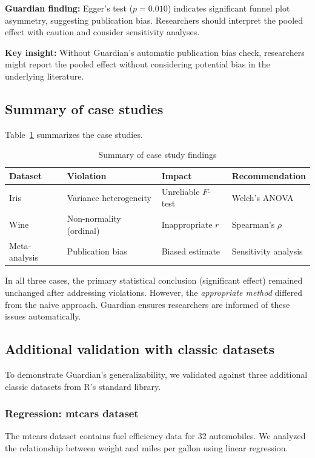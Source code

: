 \documentclass[article]{jss}
\begin{document}
\textbf{Guardian finding:} Egger's test ($p = 0.010$) indicates significant funnel plot asymmetry, suggesting publication bias. Researchers should interpret the pooled effect with caution and consider sensitivity analyses.

\textbf{Key insight:} Without Guardian's automatic publication bias check, researchers might report the pooled effect without considering potential bias in the underlying literature.

\subsection{Summary of case studies}

Table~\ref{tab:cases} summarizes the case studies.

\begin{table}[htbp]
\centering
\caption{Summary of case study findings}
\label{tab:cases}
\begin{tabular}{llll}
\toprule
Dataset & Violation & Impact & Recommendation \\
\midrule
Iris & Variance heterogeneity & Unreliable $F$-test & Welch's ANOVA \\
Wine & Non-normality (ordinal) & Inappropriate $r$ & Spearman's $\rho$ \\
Meta-analysis & Publication bias & Biased estimate & Sensitivity analysis \\
\bottomrule
\end{tabular}
\end{table}

In all three cases, the primary statistical conclusion (significant effect) remained unchanged after addressing violations. However, the \emph{appropriate method} differed from the naive approach. Guardian ensures researchers are informed of these issues automatically.

\subsection{Additional validation with classic datasets}

To demonstrate Guardian's generalizability, we validated against three additional classic datasets from R's standard library.

\subsubsection{Regression: mtcars dataset}

The mtcars dataset contains fuel efficiency data for 32 automobiles. We analyzed the relationship between weight and miles per gallon using linear regression.
\end{document}
